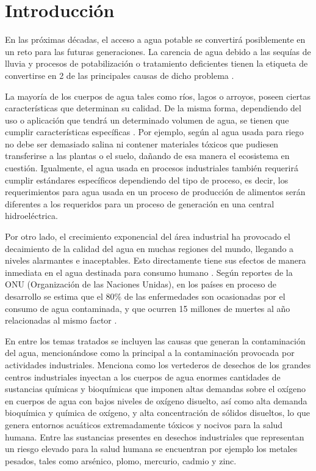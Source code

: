 \chapter{Introducción} %
\label{ch:protocolo} 

En las próximas décadas, el acceso a agua potable se convertirá posiblemente en un reto para las futuras generaciones. La carencia de agua debido a las sequías de lluvia y procesos de potabilización o tratamiento deficientes 
tienen la etiqueta de convertirse en 2 de las principales causas de dicho problema \cite{ramadhan_smart_2020}.

La mayoría de los cuerpos de agua tales como ríos, lagos o arroyos, poseen ciertas
características que determinan su calidad. De la misma forma, dependiendo del uso o 
aplicación que tendrá un determinado volumen de agua, se tienen que cumplir características específicas \cite{bahita2021}. 
Por ejemplo, según \cite{aldhyani_water_2020} al agua usada para riego no debe ser demasiado salina ni
contener materiales tóxicos que pudiesen transferirse a las plantas o el suelo, 
dañando de esa manera el ecosistema en cuestión. Igualmente, el agua usada en procesos
industriales también requerirá cumplir estándares específicos dependiendo del
tipo de proceso, es decir, los requerimientos para agua usada en un proceso de producción
de alimentos serán diferentes a los requeridos para un proceso de generación en
una central hidroeléctrica.

Por otro lado, el crecimiento exponencial del área industrial ha provocado el decaimiento de la
calidad del agua en muchas regiones del mundo, llegando a niveles alarmantes e
inaceptables. Esto directamente tiene sus efectos de manera inmediata 
en el agua destinada para consumo humano \cite{akkoyunlu2012}. Según reportes de la ONU (Organización
de las Naciones Unidas), en los países en proceso de desarrollo se estima que el
80\% de las enfermedades son ocasionadas por el consumo de agua contaminada, y que
ocurren 15 millones de muertes al año relacionadas al mismo factor \cite{aldhyani_water_2020}.

En \cite{penaMurillo_Potabilizacion_Rural} entre los temas tratados se incluyen las causas que generan la contaminación del agua, mencionándose como la principal a la contaminación provocada por actividades industriales.
Menciona como los vertederos de desechos de los grandes centros industriales inyectan a los cuerpos de agua enormes cantidades de sustancias químicas y bioquímicas que imponen altas demandas sobre el oxígeno en cuerpos de 
agua con bajos niveles de oxígeno disuelto, así como alta demanda bioquímica y química de oxígeno, y alta concentración de sólidos disueltos, lo que genera entornos acuáticos extremadamente tóxicos y nocivos para la salud 
humana. Entre las sustancias presentes en desechos industriales que representan un riesgo elevado para la salud humana se encuentran por ejemplo los metales pesados, tales como arsénico, plomo, mercurio, cadmio y zinc.

